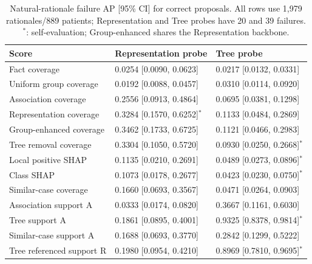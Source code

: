 \begin{table}[!tbp]\centering\footnotesize
\caption{Natural-rationale failure AP [95\% CI] for correct proposals. All rows use 1,979 rationales/889 patients; Representation and Tree probes have 20 and 39 failures. $^{*}$: self-evaluation; Group-enhanced shares the Representation backbone.}\label{tab:natural-core}
\begin{tabular}{lll}\toprule
Score & Representation probe & Tree probe \\ \midrule
Fact coverage & 0.0254 [0.0090, 0.0623] & 0.0217 [0.0132, 0.0331] \\
Uniform group coverage & 0.0192 [0.0088, 0.0457] & 0.0310 [0.0114, 0.0920] \\
Association coverage & 0.2556 [0.0913, 0.4864] & 0.0695 [0.0381, 0.1298] \\
Representation coverage & 0.3284 [0.1570, 0.6252]$^{*}$ & 0.1133 [0.0484, 0.2869] \\
Group-enhanced coverage & 0.3462 [0.1733, 0.6725] & 0.1121 [0.0466, 0.2983] \\
Tree removal coverage & 0.3304 [0.1050, 0.5720] & 0.0930 [0.0250, 0.2668]$^{*}$ \\
Local positive SHAP & 0.1135 [0.0210, 0.2691] & 0.0489 [0.0273, 0.0896]$^{*}$ \\
Class SHAP & 0.1073 [0.0178, 0.2677] & 0.0423 [0.0230, 0.0750]$^{*}$ \\
Similar-case coverage & 0.1660 [0.0693, 0.3567] & 0.0471 [0.0264, 0.0903] \\
Association support A & 0.0333 [0.0174, 0.0820] & 0.3667 [0.1161, 0.6030] \\
Tree support A & 0.1861 [0.0895, 0.4001] & 0.9325 [0.8378, 0.9814]$^{*}$ \\
Similar-case support A & 0.1688 [0.0693, 0.3770] & 0.2842 [0.1299, 0.5222] \\
Tree referenced support R & 0.1980 [0.0954, 0.4210] & 0.8969 [0.7810, 0.9695]$^{*}$ \\
\bottomrule\end{tabular}
\end{table}

